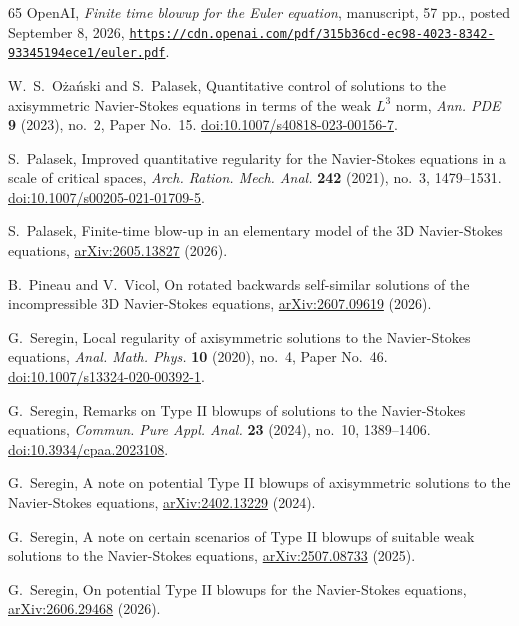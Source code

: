\documentclass[11pt,reqno]{amsproc}
\numberwithin{equation}{section}
\theoremstyle{remark}
\begin{document}
\begin{thebibliography}{65}
OpenAI,
\emph{Finite time blowup for the Euler equation},
manuscript, 57 pp., posted September 8, 2026,
\href{https://cdn.openai.com/pdf/315b36cd-ec98-4023-8342-93345194ece1/euler.pdf}{\nolinkurl{https://cdn.openai.com/pdf/315b36cd-ec98-4023-8342-93345194ece1/euler.pdf}}.

W.~S.~O\.za\'nski and S.~Palasek,
Quantitative control of solutions to the axisymmetric Navier-Stokes equations
in terms of the weak $L^3$ norm,
\emph{Ann. PDE} \textbf{9} (2023), no.~2, Paper No.~15.
\href{https://doi.org/10.1007/s40818-023-00156-7}{doi:10.1007/s40818-023-00156-7}.

S.~Palasek,
Improved quantitative regularity for the Navier-Stokes equations in a scale
of critical spaces,
\emph{Arch. Ration. Mech. Anal.} \textbf{242} (2021), no.~3, 1479--1531.
\href{https://doi.org/10.1007/s00205-021-01709-5}{doi:10.1007/s00205-021-01709-5}.

S.~Palasek,
Finite-time blow-up in an elementary model of the 3D Navier-Stokes equations,
\href{https://arxiv.org/abs/2605.13827}{arXiv:2605.13827} (2026).

B.~Pineau and V.~Vicol,
On rotated backwards self-similar solutions of the incompressible 3D Navier-Stokes equations,
\href{https://arxiv.org/abs/2607.09619}{arXiv:2607.09619} (2026).

G.~Seregin,
Local regularity of axisymmetric solutions to the Navier-Stokes equations,
\emph{Anal. Math. Phys.} \textbf{10} (2020), no.~4, Paper No.~46.
\href{https://doi.org/10.1007/s13324-020-00392-1}{doi:10.1007/s13324-020-00392-1}.

G.~Seregin,
Remarks on Type II blowups of solutions to the Navier-Stokes equations,
\emph{Commun. Pure Appl. Anal.} \textbf{23} (2024), no.~10, 1389--1406.
\href{https://doi.org/10.3934/cpaa.2023108}{doi:10.3934/cpaa.2023108}.

G.~Seregin,
A note on potential Type II blowups of axisymmetric solutions to the
Navier-Stokes equations,
\href{https://arxiv.org/abs/2402.13229}{arXiv:2402.13229} (2024).

G.~Seregin,
A note on certain scenarios of Type II blowups of suitable weak solutions
to the Navier-Stokes equations,
\href{https://arxiv.org/abs/2507.08733}{arXiv:2507.08733} (2025).

G.~Seregin,
On potential Type II blowups for the Navier-Stokes equations,
\href{https://arxiv.org/abs/2606.29468}{arXiv:2606.29468} (2026).


\end{thebibliography}
\end{document}
